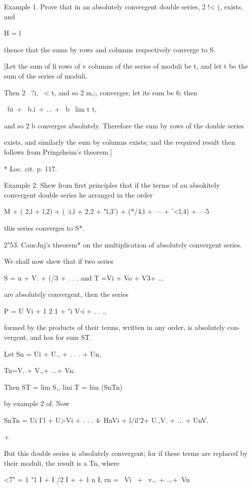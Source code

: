 Example 1. Prove that in an absolutely convergent double series, 2 !<
(, exists, and

H = l

thence that the sums by rows and columns respectively converge to S.

[Let the sum of fi rows of v columns of the series of moduli be t,
and let t be the sum of the series of moduli.

Then 2 \ ?i, \ < t, and so 2 m,;, converges; let its sum be 6;
then

\ bi\ + \ b.i\ + ... + \ b \ lim t t,

and so 2 b converges absolutely. Therefore the sum by rows of the
double series

exists, and similarly the sum by columns exists; and the required
result then follows from Pringsheim's theorem.]

* Loc. cit. p. 117.

%
%

Example 2. Shew from first principles that if the terms of au
absokitely convergent double series he arranged in the order

 M + ( 2,l + l,2) + ( :i,l + 2,2 + "l,3') + (*/4,l + --- + '<l,4) +
---5

tliis series converges to S*.

2"53. CaucJnj's theorem* on the multiplication of absolutely
convergent series.

We shall now shew that if two series

S = u + V. + (/3 + . . . and T =Vi + Vo + V3+ ...

are absolutely convergent, then the series

P = U Vi + 1 2 1 + "i V-i + . . .,

formed by the products of their terms, written in any order, is
absolutely con- vergent, and has for sum ST.

Let Sn = Ui + U., + . . . + Un,

Tn=V, + V.,+ ...+ Vn.

Then ST = lim S,, lini T = lim (SnTn)

by example 2 of. Now

SnTn = Ui I'l + U>Vi + . . . 4- HnVi + l/il'2+ U.,V. + ... + UnV.

+

But this double series is absolutely convergent; for if these terms
are replaced by their moduli, the result is a Tn, where

<7" = 1 "1 I + I /2 I +    + 1 n I, rn = \ Vi \ + \ v.,\ + ...+\
Vn\,

